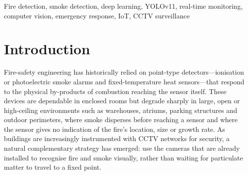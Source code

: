 \documentclass[conference]{IEEEtran}
\newcommand{\Ptot}{0.519}\newcommand{\Rtot}{0.490}\newcommand{\Ftot}{0.504}\newcommand{\MAPtot}{0.484}\newcommand{\MAPStot}{0.247}
\begin{document}
\begin{abstract}
Fire outbreaks in residential, industrial and public infrastructure remain a leading cause of property loss and casualties, and the delay between ignition and human-observed detection is often the largest contributor to escalation. Point-type smoke and heat sensors are inexpensive but slow in open or high-ceiling spaces and cannot localise an event, while manual monitoring of CCTV feeds is unreliable over long shifts. This paper presents a vision-first fire and smoke detection system that operates on existing camera infrastructure and converts detections into verified alerts within seconds. The pipeline combines a stratified two-source fire and smoke corpus (indoor and outdoor, 4{,}200 annotated images), a YOLOv11n single-stage detector fine-tuned from COCO weights, a temporal decision engine with separate warning, confirmation and clearing thresholds, optional sensor fusion with a low-cost IoT gas and temperature node, evidence capture, multi-channel notification, and a web dashboard backed by a REST API and an event database. On a held-out test split of 600 images the detector reaches mAP@0.5 of \MAPtot{} (fire \MAPfire{}, smoke \MAPsmoke{}) with precision \Ptot{} and recall \Rtot{}, and runs at \LATfps{} frames per second on a laptop CPU without a GPU. The temporal engine suppresses single-frame false alarms and is verified by unit tests and live fail-safe scenarios (camera loss, sensor disconnect, network loss, emergency stop). Limitations under dense smoke, steam, fog and low light are discussed together with a roadmap toward edge deployment and multi-camera operation.
\end{abstract}

\begin{IEEEkeywords}
Fire detection, smoke detection, deep learning, YOLOv11, real-time monitoring, computer vision, emergency response, IoT, CCTV surveillance
\end{IEEEkeywords}

\section{Introduction}
Fire-safety engineering has historically relied on point-type detectors---ionisation or photoelectric smoke alarms and fixed-temperature heat sensors---that respond to the physical by-products of combustion reaching the sensor itself. These devices are dependable in enclosed rooms but degrade sharply in large, open or high-ceiling environments such as warehouses, atriums, parking structures and outdoor perimeters, where smoke disperses before reaching a sensor and where the sensor gives no indication of the fire's location, size or growth rate. As buildings are increasingly instrumented with CCTV networks for security, a natural complementary strategy has emerged: use the cameras that are already installed to recognise fire and smoke visually, rather than waiting for particulate matter to travel to a fixed point.
\end{document}

